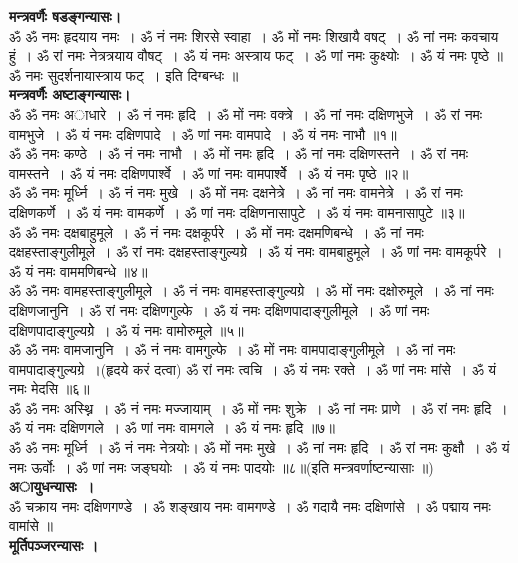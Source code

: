 \documentclass[twoside,top=1.7cm, bottom=1.7cm, outer=1cm,landscape, inner=1.5cm,a5paper,]{book}
\begin{document}
{\bfseries मन्त्रवर्णैः षडङ्गन्यासः।}\\
ॐ ॐ नमः हृदयाय नमः~। ॐ नं नमः शिरसे स्वाहा~। ॐ मों नमः शिखायै वषट्~। ॐ नां नमः कवचाय हुं~। ॐ रां नमः नेत्रत्रयाय वौषट्~। ॐ यं नमः अस्त्राय फट्~। ॐ णां नमः कुक्ष्योः~। ॐ यं नमः पृष्ठे ॥\\
ॐ नमः सुदर्शनायास्त्राय फट्~। इति दिग्बन्धः ॥\\[10pt]
{\bfseries मन्त्रवर्णैः अष्टाङ्गन्यासः।}\\
ॐ ॐ नमः अाधारे~। ॐ नं नमः हृदि~। ॐ मों नमः वक्त्रे~। ॐ नां नमः दक्षिणभुजे~। ॐ रां नमः वामभुजे~। ॐ यं नमः दक्षिणपादे~। ॐ णां नमः वामपादे~। ॐ यं नमः नाभौ ॥१॥\\
ॐ ॐ नमः कण्ठे~। ॐ नं नमः नाभौ~। ॐ मों नमः हृदि~। ॐ नां नमः दक्षिणस्तने~। ॐ रां नमः वामस्तने~। ॐ यं नमः दक्षिणपार्श्वे~। ॐ णां नमः वामपार्श्वेे~। ॐ यं नमः पृष्ठे ॥२॥\\[10pt]
ॐ ॐ नमः मूर्ध्नि~। ॐ नं नमः मुखे~। ॐ मों नमः दक्षनेत्रे~। ॐ नां नमः वामनेत्रे~। ॐ रां नमः दक्षिणकर्णे~। ॐ यं नमः वामकर्णे~। ॐ णां नमः दक्षिणनासापुटे~। ॐ यं नमः वामनासापुटे ॥३॥\\[10pt]
ॐ ॐ नमः दक्षबाहुमूले~। ॐ नं नमः दक्षकूर्परे~। ॐ मों नमः दक्षमणिबन्धे~। ॐ नां नमः दक्षहस्ताङ्गुलीमूले~। ॐ रां नमः दक्षहस्ताङ्गुल्यग्रे~। ॐ यं नमः वामबाहुमूले~। ॐ णां नमः वामकूर्परेे~। ॐ यं नमः वाममणिबन्धे ॥४॥\\[10pt]
ॐ ॐ नमः वामहस्ताङ्गुलीमूले~। ॐ नं नमः वामहस्ताङ्गुल्यग्रे~। ॐ मों नमः दक्षोरुमूले~। ॐ नां नमः दक्षिणजानुनि~। ॐ रां नमः दक्षिणगुल्फे~। ॐ यं नमः दक्षिणपादाङ्गुलीमूले~। ॐ णां नमः दक्षिणपादाङ्गुल्यग्रेे~। ॐ यं नमः वामोरुमूले ॥५॥\\[10pt]
ॐ ॐ नमः वामजानुनि~। ॐ नं नमः वामगुल्फे~। ॐ मों नमः वामपादाङ्गुलीमूले~। ॐ नां नमः वामपादाङ्गुल्यग्रे~।(हृदये करं दत्वा) ॐ रां नमः त्वचि~। ॐ यं नमः रक्ते~। ॐ णां नमः मांसे~। ॐ यं नमः  मेदसि ॥६॥\\[10pt]
ॐ ॐ नमः अस्थ्नि~। ॐ नं नमः मज्जायाम्~। ॐ मों नमः शुक्रे~। ॐ नां नमः प्राणे~। ॐ रां नमः हृदि~। ॐ यं नमः दक्षिणगले~। ॐ णां नमः वामगले~। ॐ यं नमः  हृदि ॥७॥\\[10pt]
ॐ ॐ नमः मूर्ध्नि~। ॐ नं नमः नेत्रयोः। ॐ मों नमः मुखे~। ॐ नां नमः हृदि~। ॐ रां नमः कुक्षौ~। ॐ यं नमः ऊर्वोः~। ॐ णां नमः जङ्घयोः~। ॐ यं नमः पादयोः ॥८॥(इति मन्त्रवर्णाष्टन्यासाः ॥)\\[10pt]
{\bfseries अायुधन्यासः~।}\\ॐ चक्राय नमः दक्षिणगण्डे~। ॐ शङ्खाय नमः वामगण्डे~। ॐ गदायै नमः दक्षिणांसे~। ॐ पद्माय नमः वामांसे ॥ \\[10pt]
{\bfseries मूर्तिपञ्जरन्यासः ।}\\
\end{document}
